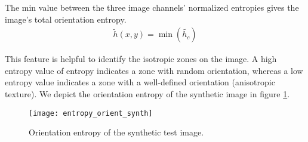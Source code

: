 The min value between the three image channels' normalized entropies gives the image's total orientation entropy.
\begin{gather}
    \widetilde{h}(x,y) = \min(\widetilde{h_c}) \label{eq:entropy_orient}
\end{gather}

This feature is helpful to identify the isotropic zones on the image. A high entropy value of entropy indicates a zone with random orientation, whereas a low entropy value indicates a zone with a well-defined orientation (anisotropic texture). We depict the orientation entropy of the synthetic image in figure \ref{fig:entropy_orient_synth}.

\begin{figure}[!ht]
	\texttt{[image: entropy\_orient\_synth]}
    \caption{Orientation entropy of the synthetic test image.}
    \label{fig:entropy_orient_synth}
\end{figure}

%                  

